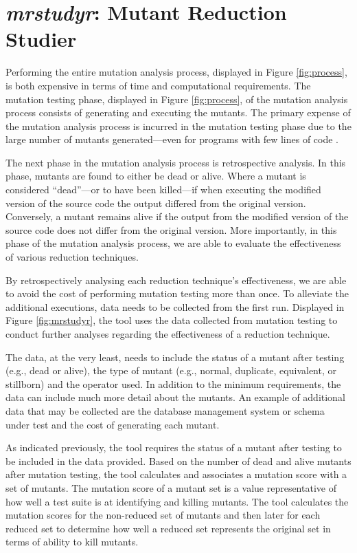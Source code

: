 

\section{\textit{mrstudyr}: Mutant Reduction Studier}

Performing the entire mutation analysis process, displayed in Figure \ref{fig:process},
is both expensive in terms of time and computational requirements. The mutation testing
phase, displayed in Figure \ref{fig:process}, of the mutation analysis
process consists of generating and executing the mutants. The primary
expense of the mutation analysis process is incurred in the mutation testing phase
due to the large number of mutants generated---even for programs with few lines of code \cite{offutt2001mutation}.

The next phase in the mutation analysis process is retrospective analysis. In this
phase, mutants are found to either be dead or alive. Where a mutant is considered
``dead''---or to have been killed---if when executing the modified version of the source
code the output differed from the original version. Conversely, a mutant remains alive
if the output from the modified version of the source code does not differ from the
original version. More importantly, in this phase of the mutation analysis process,
we are able to evaluate the effectiveness of various reduction techniques.

By retrospectively analysing each reduction technique's effectiveness, we are
able to avoid the cost of performing mutation testing more than once. To alleviate
the additional executions, data needs to be collected
from the first run. Displayed in Figure \ref{fig:mrstudyr},
the \mr tool uses the data collected from mutation testing to conduct further analyses
regarding the effectiveness of a reduction technique.

The data, at the very least, needs to include the status of
a mutant after testing (e.g., dead or alive), the type of mutant (e.g., normal, duplicate, equivalent, or stillborn)
and the operator used. In addition to the minimum requirements, the data can include much
more detail about the mutants. An example of additional data that may be collected are the database
management system or schema under test and the cost of generating each mutant.

As indicated previously, the \mr tool requires the status of a mutant after testing to be included
in the data provided.
Based on the number of dead and alive mutants after mutation testing,
the \mr tool calculates and associates a mutation score with a set of mutants.
The mutation score of a mutant set is a value representative of how well
a test suite is at identifying and killing mutants. The \mr tool calculates the
mutation scores for the non-reduced set of mutants and then later for each reduced set
to determine how well a reduced set represents the original set in terms of ability to kill mutants.

